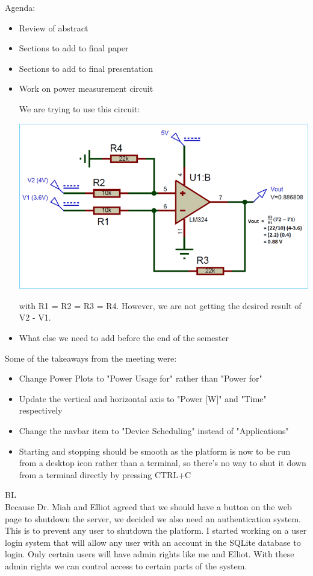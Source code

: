 \documentclass[fontsize=11pt, %
                             paper=letter, %
                             openany, %
                             captions=tableheading,
                             index=totoc,
                             hyperref]{labbook}
\begin{document}
Agenda:
\begin{itemize}
\item Review of abstract
\item Sections to add to final paper
\item Sections to add to final presentation
\item Work on power measurement circuit

We are trying to use this circuit:

\includegraphics[scale=0.6]{figs/voltageSubtractor.png}

with R1 = R2 = R3 = R4. However, we are not getting the desired result of V2 - V1.

\item What else we need to add before the end of the semester
\end{itemize}
Some of the takeaways from the meeting were:
\begin{itemize}
\item Change Power Plots to "Power Usage for" rather than "Power for"
\item Update the vertical and horizontal axis to "Power [W]" and "Time" respectively
\item Change the navbar item to "Device Scheduling" instead of "Applications"
\item Starting and stopping should be smooth as the platform is now to be run from a desktop icon rather than a terminal, so there's no way to shut it down from a terminal directly by pressing CTRL+C
\end{itemize}
BL\\
Because Dr. Miah and Elliot agreed that we should have a button on the web page to shutdown the server, we decided we also need an authentication system. This is to prevent any user to shutdown the platform. 
\medbreak\noindent
I started working on a user login system that will allow any user with an account in the SQLite database to login. Only certain users will have admin rights like me and Elliot. With these admin rights we can control access to certain parts of the system.
\end{document}
